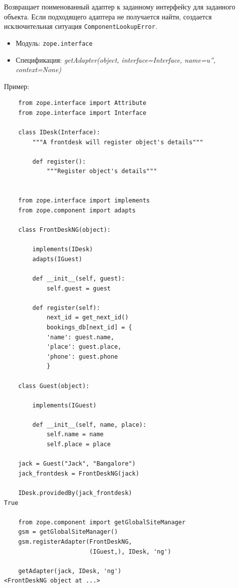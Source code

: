 \documentclass[a4paper,openany,twoside,draft]{book}
\providecommand*{\DUroletitlereference}[1]{\textsl{#1}}
\begin{document}
Возвращает поименованный адаптер к заданному интерфейсу для заданного объекта.  Если подходящего адаптера не получается найти, создается исключительная ситуация \texttt{ComponentLookupError}.

\begin{itemize}

\item Модуль: \texttt{zope.interface}

\item Спецификация: \DUroletitlereference{getAdapter(object, interface=Interface, name=u'', context=None)}

\end{itemize}

Пример:

\begin{verbatim}
    from zope.interface import Attribute
    from zope.interface import Interface

    class IDesk(Interface):
        """A frontdesk will register object's details"""

        def register():
            """Register object's details"""


    from zope.interface import implements
    from zope.component import adapts

    class FrontDeskNG(object):

        implements(IDesk)
        adapts(IGuest)

        def __init__(self, guest):
            self.guest = guest

        def register(self):
            next_id = get_next_id()
            bookings_db[next_id] = {
            'name': guest.name,
            'place': guest.place,
            'phone': guest.phone
            }

    class Guest(object):

        implements(IGuest)

        def __init__(self, name, place):
            self.name = name
            self.place = place

    jack = Guest("Jack", "Bangalore")
    jack_frontdesk = FrontDeskNG(jack)

    IDesk.providedBy(jack_frontdesk)
True

    from zope.component import getGlobalSiteManager
    gsm = getGlobalSiteManager()
    gsm.registerAdapter(FrontDeskNG,
                        (IGuest,), IDesk, 'ng')

    getAdapter(jack, IDesk, 'ng')
<FrontDeskNG object at ...>
\end{verbatim}
\end{document}
